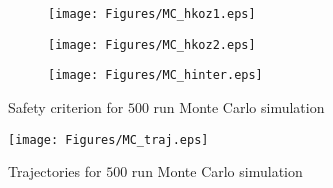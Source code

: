 \begin{figure}[h!]
    \centering
     \begin{subfigure}[b]{0.325\textwidth}
        \centering
         \texttt{[image: Figures/MC\_hkoz1.eps]}
         \caption{}\label{fig:MC_hkoz1}
     \end{subfigure}   
     \begin{subfigure}[b]{0.325\textwidth}
        \centering
         \texttt{[image: Figures/MC\_hkoz2.eps]}
         \caption{}\label{fig:MC_hkoz2.eps}
     \end{subfigure}
     \begin{subfigure}[b]{0.325\textwidth}
        \centering
         \texttt{[image: Figures/MC\_hinter.eps]}
         \caption{}\label{fig:MC_hinter.eps}
     \end{subfigure}
    \caption{Safety criterion for $500$ run Monte Carlo simulation}
    \label{fig:MC_hvals}
\end{figure}

\begin{figure}[!t]
\centerline{\texttt{[image: Figures/MC\_traj.eps]}}
\caption{Trajectories for $500$ run Monte Carlo simulation}
\label{fig:MC_traj.eps}
\end{figure}

